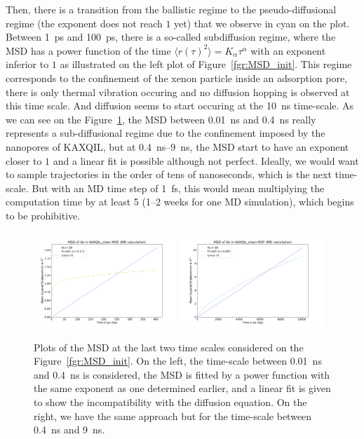\documentclass[main]{subfiles}
\begin{document}
Then, there is a transition from the ballistic regime to the pseudo-diffusional regime (the exponent does not reach $1$ yet) that we observe in cyan on the plot. Between \SI{1}{\ps} and \SI{100}{\ps}, there is a so-called subdiffusion regime, where the MSD has a power function of the time $\langle {r(\tau)}^2 \rangle=K_\alpha\tau^\alpha$ with an exponent inferior to $1$ as illustrated on the left plot of Figure~\ref{fgr:MSD_init}. This regime corresponds to the confinement of the xenon particle inside an adsorption pore, there is only thermal vibration occuring and no diffusion hopping is observed at this time scale. And diffusion seems to start occuring at the \SI{10}{\ns} time-scale. As we can see on the Figure~\ref{fgr:MSD_linear_init}, the MSD between \SI{0.01}{\ns} and \SI{0.4}{\ns} really represents a sub-diffusional regime due to the confinement imposed by the nanopores of KAXQIL, but at \SI{0.4}{\ns}--\SI{9}{\ns}, the MSD start to have an exponent closer to $1$ and a linear fit is possible although not perfect. Ideally, we would want to sample trajectories in the order of tens of nanoseconds, which is the next time-scale. But with an MD time step of \SI{1}{\fs}, this would mean multiplying the computation time by at least 5 (1--2 weeks for one MD simulation), which begins to be prohibitive. 

\begin{figure}[ht]
  \centering
\includegraphics[width=0.48\textwidth]{figures/5-diffusion/MSD_Xe_coeff_KAXQIL_clean_1.pdf}
\includegraphics[width=0.48\textwidth]{figures/5-diffusion/MSD_Xe_coeff_KAXQIL_clean_2.pdf}
\caption{ Plots of the MSD at the last two time scales considered on the Figure~\ref{fgr:MSD_init}. On the left, the time-scale between \SI{0.01}{\ns} and \SI{0.4}{\ns} is considered, the MSD is fitted by a power function with the same exponent as one determined earlier, and a linear fit is given to show the incompatibility with the diffusion equation. On the right, we have the same approach but for the time-scale between \SI{0.4}{\ns} and \SI{9}{\ns}. }\label{fgr:MSD_linear_init}
\end{figure}
\end{document}

